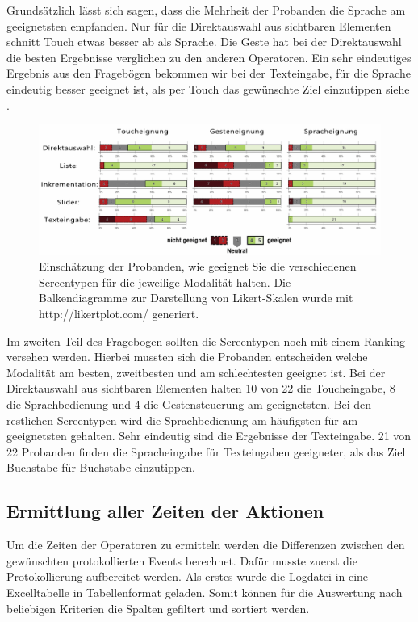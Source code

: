 Grundsätzlich lässt sich sagen, dass die Mehrheit der Probanden die Sprache am geeignetsten empfanden. Nur für die Direktauswahl aus sichtbaren Elementen schnitt Touch etwas besser ab als Sprache. 
Die Geste hat bei der Direktauswahl die besten Ergebnisse verglichen zu den anderen Operatoren. 
Ein sehr eindeutiges Ergebnis aus den Fragebögen bekommen wir bei der Texteingabe, für die Sprache eindeutig besser geeignet ist, als per Touch das gewünschte Ziel einzutippen siehe .
\begin{figure}[ht]
  \centering
  \includegraphics[width=1\textwidth]{img/Uebersicht_Eignung}
  \caption[Eignung des Screentypen]{Einschätzung der Probanden, wie geeignet Sie die verschiedenen Screentypen für die jeweilige Modalität halten. 
	Die Balkendiagramme zur Darstellung von Likert-Skalen wurde mit http://likertplot.com/ generiert.}
  \label{fig:Uebersicht_Eignung}
\end{figure}

Im zweiten Teil des Fragebogen sollten die Screentypen noch mit einem Ranking versehen werden. 
Hierbei mussten sich die Probanden entscheiden welche Modalität am besten, zweitbesten und am schlechtesten geeignet ist. 
Bei der Direktauswahl aus sichtbaren Elementen halten 10 von 22 die Toucheingabe, 8 die Sprachbedienung und 4 die Gestensteuerung am geeignetsten. 
Bei den restlichen Screentypen wird die Sprachbedienung am häufigsten für am geeignetsten gehalten. 
Sehr eindeutig sind die Ergebnisse der Texteingabe. 
21 von 22 Probanden finden die Spracheingabe für Texteingaben geeigneter, als das Ziel Buchstabe für Buchstabe einzutippen.

\subsection[Ermittlung der Zeiten der Aktionen]{Ermittlung aller Zeiten der Aktionen}
Um die Zeiten der Operatoren zu ermitteln werden die Differenzen zwischen den gewünschten protokollierten Events berechnet. 
Dafür musste zuerst die Protokollierung aufbereitet werden. 
Als erstes wurde die Logdatei in eine Excelltabelle in Tabellenformat geladen. 
Somit können für die Auswertung nach beliebigen Kriterien die Spalten gefiltert und sortiert werden. 

